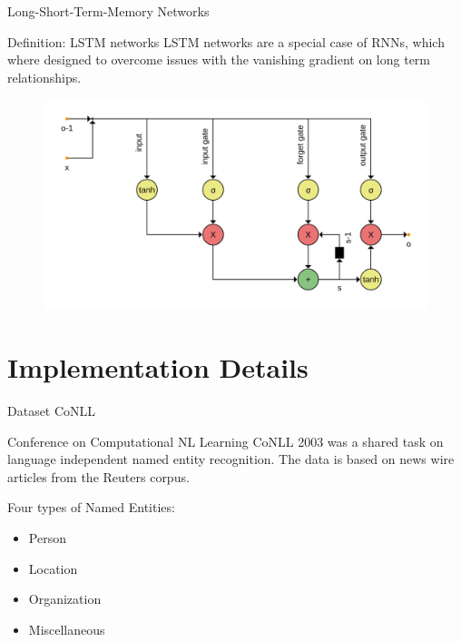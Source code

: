 \documentclass[12pt, tikz]{beamer}
\begin{document}
\begin{frame}[fragile]{Long-Short-Term-Memory Networks}

	\begin{block}{Definition: LSTM networks}
		LSTM networks are a special case of RNNs, which where designed to overcome issues with the vanishing gradient on long term relationships.
	\end{block}
	\pause
	\vspace{-0.35cm}
	\begin{figure}
		\includegraphics[width=\linewidth]{img/lstm.png}
	\end{figure}
\end{frame}

\section{Implementation Details}

\begin{frame}[fragile]{Dataset CoNLL}
	
	\begin{block}{Conference on Computational NL Learning}
		CoNLL 2003 was a shared task on language independent named entity recognition. The data is based on news wire articles from the Reuters corpus.
	\end{block}

	Four types of Named Entities:
	\begin{itemize}
		\item Person
		\item Location
		\item Organization
		\item Miscellaneous
	\end{itemize}

\end{frame}
\end{document}
